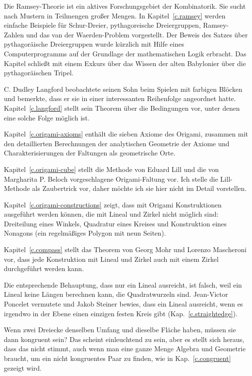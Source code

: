 Die Ramsey-Theorie ist ein aktives Forschungsgebiet der Kombinatorik. Sie sucht nach Mustern in Teilmengen großer Mengen. In Kapitel~\ref{c.ramsey} werden einfache Beispiele für Schur-Dreier, pythagoreische Dreiergruppen, Ramsey-Zahlen und das van der Waerden-Problem vorgestellt. Der Beweis des Satzes über pythagoräische Dreiergruppen wurde kürzlich mit Hilfe eines Computerprogramms auf der Grundlage der mathematischen Logik erbracht. Das Kapitel schließt mit einem Exkurs über das Wissen der alten Babylonier über die pythagoräischen Tripel.

C. Dudley Langford beobachtete seinen Sohn beim Spielen mit farbigen Blöcken und bemerkte, dass er sie in einer interessanten Reihenfolge angeordnet hatte. Kapitel~\ref{c.langford} stellt sein Theorem über die Bedingungen vor, unter denen eine solche Folge möglich ist.

Kapitel~\ref{c.origami-axioms} enthält die sieben Axiome des Origami, zusammen mit den detaillierten Berechnungen der analytischen Geometrie der Axiome und Charakterisierungen der Faltungen als geometrische Orte.

Kapitel~\ref{c.origami-cube} stellt die Methode von Eduard Lill und die von Margharita P. Beloch vorgeschlagene Origami-Faltung vor. Ich stelle die Lill-Methode als Zaubertrick vor, daher möchte ich sie hier nicht im Detail vorstellen.

Kapitel~\ref{c.origami-constructions} zeigt, dass mit Origami Konstruktionen ausgeführt werden können, die mit Lineal und Zirkel nicht möglich sind: Dreiteilung eines Winkels, Quadratur eines Kreises und Konstruktion eines Nonagons (ein regelmäßiges Polygon mit neun Seiten).

Kapitel~\ref{c.compass} stellt das Theorem von Georg Mohr und Lorenzo Mascheroni vor, dass jede Konstruktion mit Lineal und Zirkel auch mit einem Zirkel durchgeführt werden kann.

Die entsprechende Behauptung, dass nur ein Lineal ausreicht, ist falsch, weil ein Lineal keine Längen berechnen kann, die Quadratwurzeln sind. Jean-Victor Poncelet vermutete und Jakob Steiner bewies, dass ein Lineal ausreicht, wenn es irgendwo in der Ebene einen einzigen festen Kreis gibt (Kap.~\ref{c.straightedge}).

Wenn zwei Dreiecke denselben Umfang und dieselbe Fläche haben, müssen sie dann kongruent sein? Das scheint einleuchtend zu sein, aber es stellt sich heraus, dass das nicht stimmt, auch wenn man eine ganze Menge Algebra und Geometrie braucht, um ein nicht kongruentes Paar zu finden, wie in Kap.~\ref{c.congruent} gezeigt wird.

